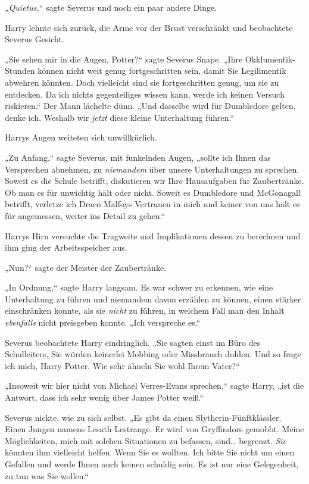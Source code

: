 {„\emph{Quietus,}“ sagte Severus und noch ein paar andere Dinge.

Harry lehnte sich zurück, die Arme vor der Brust verschränkt und beobachtete Severus Gesicht.

„Sie sehen mir in die Augen, Potter?“ sagte Severus Snape. „Ihre Okklumentik-Stunden können nicht weit genug fortgeschritten sein, damit Sie Legilimentik abwehren könnten. Doch vielleicht sind sie fortgeschritten genug, um sie zu entdecken. Da ich nichts gegenteiliges wissen kann, werde ich keinen Versuch riskieren.“ Der Mann lächelte dünn. „Und dasselbe wird für Dumbledore gelten, denke ich. Weshalb wir \emph{jetzt} diese kleine Unterhaltung führen.“

Harrys Augen weiteten sich unwillkürlich.

„Zu Anfang,“ sagte Severus, mit funkelnden Augen, „sollte ich Ihnen das Versprechen abnehmen, zu \emph{niemandem} über unsere Unterhaltungen zu sprechen. Soweit es die Schule betrifft, diskutieren wir Ihre Hausaufgaben für Zaubertränke. Ob man es für unwichtig hält oder nicht. Soweit es Dumbledore und McGonagall betrifft, verletze ich Draco Malfoys Vertrauen in mich und keiner von uns hält es für angemessen, weiter ins Detail zu gehen.“

Harrys Hirn versuchte die Tragweite und Implikationen dessen zu berechnen und ihm ging der Arbeitsspeicher aus.

„Nun?“ sagte der Meister der Zaubertränke.

„In Ordnung,“ sagte Harry langsam. Es war schwer zu erkennen, wie eine Unterhaltung zu führen und niemandem davon erzählen zu können, einen stärker einschränken konnte, als sie \emph{nicht} zu führen, in welchem Fall man den Inhalt \emph{ebenfalls} nicht preisgeben konnte. „Ich verspreche es.“

Severus beobachtete Harry eindringlich. „Sie sagten einst im Büro des Schulleiters, Sie würden keinerlei Mobbing oder Missbrauch dulden. Und so frage ich mich, Harry Potter. Wie sehr ähneln Sie wohl Ihrem Vater?“

„Insoweit wir hier nicht von Michael Verres-Evans sprechen,“ sagte Harry, „ist die Antwort, dass ich sehr wenig über James Potter weiß.“

Severus nickte, wie zu sich selbst. „Es gibt da einen Slytherin-Fünftklässler. Einen Jungen namens Lesath Lestrange. Er wird von Gryffindors gemobbt. Meine Möglichkeiten, mich mit solchen Situationen zu befassen, sind… begrenzt. \emph{Sie} könnten ihm vielleicht helfen. Wenn Sie es wollten. Ich bitte Sie nicht um einen Gefallen und werde Ihnen auch keinen schuldig sein. Es ist nur eine Gelegenheit, zu tun was Sie wollen.“

}
